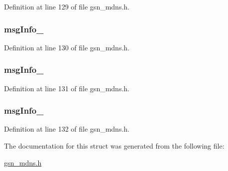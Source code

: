 Definition at line 129 of file gsn\_\-mdns.h.

\hypertarget{a00145_a88b43728a9e439e9db0c0dc90b89ed51}{
\subsubsection[{msgInfo\_\-1}]{ {\bf msgInfo\_}}}
\label{a00145_a88b43728a9e439e9db0c0dc90b89ed51}


Definition at line 130 of file gsn\_\-mdns.h.

\hypertarget{a00145_a35942ac10c01f580e05a7104ea144a0f}{
\subsubsection[{msgInfo\_\-2}]{ {\bf msgInfo\_}}}
\label{a00145_a35942ac10c01f580e05a7104ea144a0f}


Definition at line 131 of file gsn\_\-mdns.h.

\hypertarget{a00145_a01a9e313a5220b8540652d0f937c28b4}{
\subsubsection[{msgInfo\_\-3}]{ {\bf msgInfo\_}}}
\label{a00145_a01a9e313a5220b8540652d0f937c28b4}


Definition at line 132 of file gsn\_\-mdns.h.



The documentation for this struct was generated from the following file:\begin{DoxyCompactItemize}
\item 
\hyperlink{a00526}{gsn\_\-mdns.h}\end{DoxyCompactItemize}
